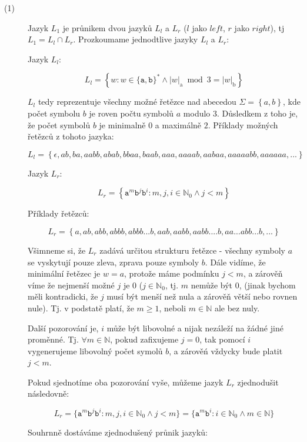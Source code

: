 \documentclass[10pt]{article}
\begin{document}
\begin{description}
\item[(1)]

Jazyk $L_1$ je průnikem dvou jazyků $L_{l}$ a $L_{r}$ ($l$ jako $left$, $r$ jako $right$), tj $L_1 = L_l \cap L_r$. Prozkoumame jednodtlive jazyky $L_l$ a $L_r$:

Jazyk $L_l$:

$$L_l = \left\{w: w \in\{\mathtt{a}, \mathtt{b}\}^{*} \wedge|w|_{\mathrm{a}} \bmod 3=|w|_{\mathrm{b}}\right\}$$

$L_l$ tedy reprezentuje všechny možné řetězce nad abecedou $\Sigma = \left\{a, b\right\}$, kde počet symbolu $b$ je roven počtu symbolů $a$ modulo 3. Důsledkem z toho je, že počet symbolů $b$ je minimalně $0$ a maximálně $2$. Příklady možných řetězců z tohoto jazyka:

$$L_l = \left\{
\epsilon,
ab, ba, aabb, abab, bbaa, baab, aaa, aaaab, aabaa, aaaaabb, aaaaaa, ... 
\right\}$$

Jazyk $L_r$:

$$L_r = \left\{\mathtt{a}^{m} \mathtt{b}^{j} \mathtt{b}^{i}: m, j, i \in \mathbb{N}_{0} \wedge j<m\right\}$$

Příklady řetězců:

$$L_r = \left\{
a, ab, abb, abbb, abbb...b, aab, aabb, aabb....b, aa...abb...b, ... 
\right\}$$

Všimneme si, že $L_r$ zadává určitou strukturu řetězce - všechny symboly $a$ se vyskytují pouze zleva, zprava pouze symboly $b$. 
Dále vidíme, že minimální řetězec je $w = a$, protože máme podmínku $j<m$, a zárověň víme že nejmenší možné $j$ je $0$ ($j\in\mathbb{N}_{0}$, tj. $m$ nemůže být $0$, (jinak bychom měli kontradicki, že $j$ musí být menší než nula a zárověň větší nebo rovnen nule). Tj. v podstatě platí, že $m \geq 1$, neboli $m \in \mathbb{N}$ ale bez nuly.

Další pozorování je, $i$ může být libovolné a nijak nezáleží na žádné jiné proměnné. Tj. $\forall m \in \mathbb{N}$, pokud zafixujeme $j = 0$, tak pomocí $i$ vygenerujeme libovolný počet symolů $b$, a zárověń vždycky bude platit $j < m$.

Pokud sjednotíme oba pozorování vyše, můžeme jazyk $L_r$ zjednodušit následovně:

$$L_r = \{\mathtt{a}^{m} \mathtt{b}^{j} \mathtt{b}^{i}: m, j, i \in \mathbb{N}_{0} \wedge j<m\}
= \{\mathtt{a}^{m} \mathtt{b}^{i}: i \in \mathbb{N}_{0} \land m \in \mathbb{N}\}$$

Souhrnně dostáváme zjednodušený průnik jazyků:


\end{description}
\end{document}
